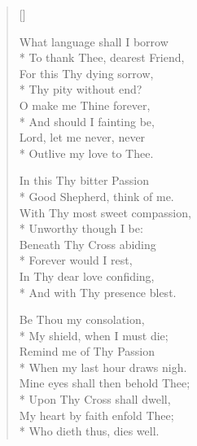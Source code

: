 \begin{verse}[\versewidth]
\begin{altverse}
 What language shall I borrow\\*
To thank Thee, dearest Friend,\\
For this Thy dying sorrow,\\*
Thy pity without end?\\
O make me Thine forever,\\*
And should I fainting be,\\
Lord, let me never, never\\*
Outlive my love to Thee.
\end{altverse}

\begin{altverse}
 In this Thy bitter Passion\\*
Good Shepherd, think of me.\\
With Thy most sweet compassion,\\*
Unworthy though I be:\\
Beneath Thy Cross abiding\\*
Forever would I rest,\\
In Thy dear love confiding,\\*
And with Thy presence blest.
\end{altverse}

\begin{altverse}
 Be Thou my consolation,\\*
My shield, when I must die;\\
Remind me of Thy Passion\\*
When my last hour draws nigh.\\
Mine eyes shall then behold Thee;\\*
Upon Thy Cross shall dwell,\\
My heart by faith enfold Thee;\\*
Who dieth thus, dies well.
\end{altverse}
\end{verse}


